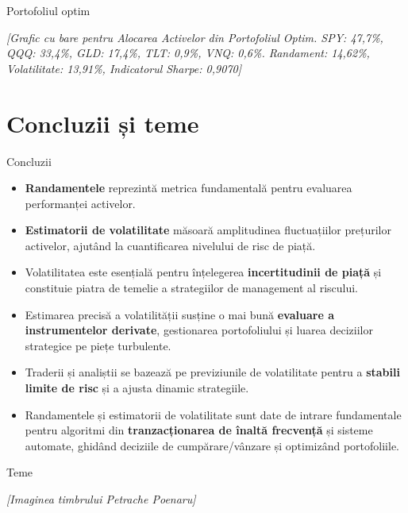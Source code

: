 \documentclass[9pt, aspectratio=169, t]{beamer}
\theoremstyle{definition}
\begin{document}
\begin{frame}{Portofoliul optim}
\begin{center}
    {\small\textit{[Grafic cu bare pentru Alocarea Activelor din Portofoliul Optim. SPY: 47,7\%, QQQ: 33,4\%, GLD: 17,4\%, TLT: 0,9\%, VNQ: 0,6\%. Randament: 14,62\%, Volatilitate: 13,91\%, Indicatorul Sharpe: 0,9070]}}
\end{center}
\end{frame}

\section{Concluzii și teme}

\begin{frame}{Concluzii}
\begin{itemize}
    \item \textbf{Randamentele} reprezintă metrica fundamentală pentru evaluarea performanței activelor.
    \item \textbf{Estimatorii de volatilitate} măsoară amplitudinea fluctuațiilor prețurilor activelor, ajutând la cuantificarea nivelului de risc de piață.
    \item Volatilitatea este esențială pentru înțelegerea \textbf{incertitudinii de piață} și constituie piatra de temelie a strategiilor de management al riscului.
    \item Estimarea precisă a volatilității susține o mai bună \textbf{evaluare a instrumentelor derivate}, gestionarea portofoliului și luarea deciziilor strategice pe piețe turbulente.
    \item Traderii și analiștii se bazează pe previziunile de volatilitate pentru a \textbf{stabili limite de risc} și a ajusta dinamic strategiile.
    \item Randamentele și estimatorii de volatilitate sunt date de intrare fundamentale pentru algoritmi din \textbf{tranzacționarea de înaltă frecvență} și sisteme automate, ghidând deciziile de cumpărare/vânzare și optimizând portofoliile.
\end{itemize}
\end{frame}

\begin{frame}{Teme}
\begin{center}
    {\small\textit{[Imaginea timbrului Petrache Poenaru]}}
\end{center}
\end{frame}
\end{document}

